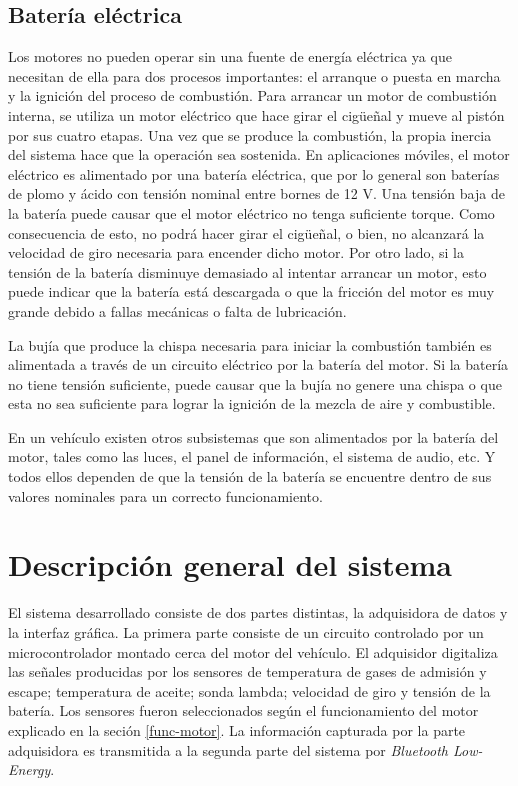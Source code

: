 \subsection{Batería eléctrica}
Los motores no pueden operar sin una fuente de energía eléctrica ya que necesitan de ella para dos procesos importantes: el arranque o puesta en marcha y la ignición del proceso de combustión.
Para arrancar un motor de combustión interna, se utiliza un motor eléctrico que hace girar el cigüeñal y mueve al pistón por sus cuatro etapas. Una vez que se produce la combustión, la propia inercia del sistema hace que la operación sea sostenida. En aplicaciones móviles, el motor eléctrico es alimentado por una batería eléctrica, que por lo general son baterías de plomo y ácido con tensión nominal entre bornes de 12 V. Una tensión baja de la batería puede causar que el motor eléctrico no tenga suficiente torque. Como consecuencia de esto, no podrá hacer girar el cigüeñal, o bien, no alcanzará la velocidad de giro necesaria para encender dicho motor. Por otro lado, si la tensión de la batería disminuye demasiado al intentar arrancar un motor, esto puede indicar que la batería está descargada o que la fricción del motor es muy grande debido a fallas mecánicas o falta de lubricación.

La bujía que produce la chispa necesaria para iniciar la combustión también es alimentada a través de un circuito eléctrico por la batería del motor. Si la batería no tiene tensión suficiente, puede causar que la bujía no genere una chispa o que esta no sea suficiente para lograr la ignición de la mezcla de aire y combustible.

En un vehículo existen otros subsistemas que son alimentados por la batería del motor, tales como las luces, el panel de información, el sistema de audio, etc. Y todos ellos dependen de que la tensión de la batería se encuentre dentro de sus valores nominales para un correcto funcionamiento.

\section{Descripción general del sistema}

El sistema desarrollado consiste de dos partes distintas, la adquisidora de datos y la interfaz gráfica. La primera parte consiste de un circuito controlado por un microcontrolador montado cerca del motor del vehículo. El adquisidor digitaliza las señales producidas por los sensores de temperatura de gases de admisión y escape; temperatura de aceite; sonda lambda; velocidad de giro y tensión de la batería. Los sensores fueron seleccionados según el funcionamiento del motor explicado en la seción \ref{func-motor}.  La información capturada por la parte adquisidora es transmitida a la segunda parte del sistema por \textit{Bluetooth Low-Energy}.


